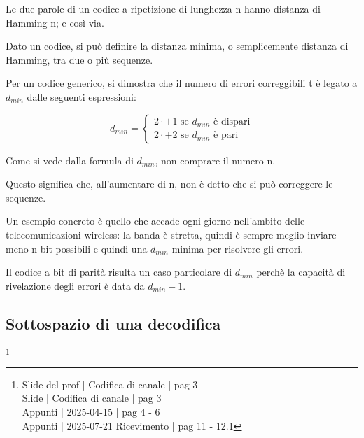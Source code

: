 Le due parole di un codice a ripetizione di lunghezza n hanno distanza di Hamming n; e così via. \newline 

Dato un codice, si può definire la distanza minima, o semplicemente distanza di Hamming, tra due o più sequenze. \newline 

Per un codice generico, si dimostra che il numero di errori correggibili t è legato a $d_{min}$ dalle seguenti espressioni: 

{
    \Large 
    \begin{equation}
        d_{min}
        = 
        \begin{cases}
            2 \cdot + 1 \text{ se $d_{min}$ è dispari}
            \\
            2 \cdot + 2 \text{ se $d_{min}$ è pari}
        \end{cases}
    \end{equation}
}

Come si vede dalla formula di $d_{min}$, non comprare il numero n. \newline 

Questo significa che, all'aumentare di n, non è detto che si può correggere le sequenze. \newline 

\begin{tcolorbox}
    Un esempio concreto è quello che accade ogni giorno nell'ambito delle telecomunicazioni wireless: 
    la banda è stretta, quindi è sempre meglio inviare meno n bit possibili e quindi una $d_{min}$ minima per risolvere gli errori. 
\end{tcolorbox}

Il codice a bit di parità risulta un caso particolare di $d_{min}$ perchè la capacità di rivelazione degli errori è data da $d_{min} - 1$. \newline 

\newpage 

\subsection{Sottospazio di una decodifica}
\footnote{Slide del prof | Codifica di canale | pag 3 \\
Slide | Codifica di canale | pag  3\\  
Appunti | 2025-04-15 | pag 4 - 6 \\
Appunti | 2025-07-21 Ricevimento | pag 11 - 12.1
} 

